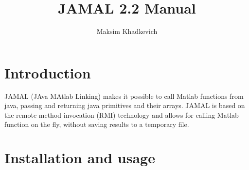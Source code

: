 \documentclass[a4paper,twoside,12pt]{report}
\begin{document}
\pagestyle{empty} %



\title{JAMAL 2.2 Manual}
\author{Maksim Khadkevich}
\maketitle



\tableofcontents %
\cleardoublepage %

\pagestyle{plain} %






\def\version{2.2}
\def\jarName{jamal-\version.jar}

\section{Introduction}\label{introduction}
JAMAL (JAva MAtlab Linking) makes it possible to call Matlab functions from java, passing and returning java primitives and their arrays. JAMAL is based on the remote method invocation (RMI) technology and allows for calling Matlab function on the fly, without saving results to a temporary file.

\section{Installation and usage}\label{installation}
\end{document}
